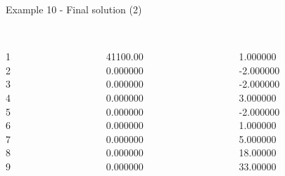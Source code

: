 \begin{frame}{Example 10 - Final solution (2)}
\footnotesize
\begin{columns}[t]
\begin{column}{0.3\textwidth}
\\
1\\
2\\
3\\
4\\
5\\
6\\
7\\
8\\
9\\

\end{column}
\begin{column}{0.3\textwidth}
\\
41100.00\\
0.000000\\
0.000000\\
0.000000\\
0.000000\\
0.000000\\
0.000000\\
0.000000\\
0.000000\\

\end{column}

\begin{column}{0.3\textwidth}
\\
1.000000\\
-2.000000\\
-2.000000\\
3.000000\\
-2.000000\\
1.000000\\
5.000000\\
18.00000\\
33.00000\\

\end{column}
\end{columns}
\end{frame}


